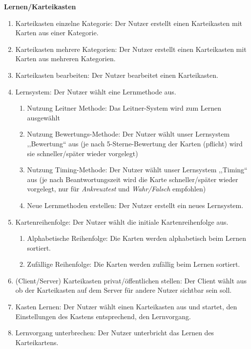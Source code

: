 \documentclass[fontsize=12pt,paper=a4,twoside]{scrartcl}
\begin{document}
\textbf{Lernen/Karteikasten}
\begin{enumerate}[resume, label={N\arabic*}]
	\item Karteikasten einzelne Kategorie: Der Nutzer erstellt einen Karteikasten mit Karten aus einer Kategorie.
	\item Karteikasten mehrere Kategorien: Der Nutzer erstellt einen Karteikasten mit Karten aus mehreren Kategorien.
	\label{N26}
	\item Karteikasten bearbeiten: Der Nutzer bearbeitet einen Karteikasten.
	\item Lernsystem: Der Nutzer wählt eine Lernmethode aus.
	\begin{enumerate}[label*=-\arabic*]
		\item Nutzung Leitner Methode: Das Leitner-System wird zum Lernen ausgewählt
		\item Nutzung Bewertungs-Methode: Der Nutzer wählt unser Lernsystem ,,Bewertung`` aus (je nach 5-Sterne-Bewertung der Karten (pflicht) wird sie schneller/später wieder vorgelegt)
		\item Nutzung Timing-Methode: Der Nutzer wählt unser Lernsystem ,,Timing`` aus (je nach Beantwortungszeit wird die Karte schneller/später wieder vorgelegt, nur für \textit{Ankreuztest} und \textit{Wahr/Falsch} empfohlen)
		\item Neue Lernmethoden erstellen: Der Nutzer erstellt ein neues Lernsystem.
	\end{enumerate}
	\item Kartenreihenfolge: Der Nutzer wählt die initiale Kartenreihenfolge aus.
	\begin{enumerate}[label*=-\arabic*]
		\item Alphabetische Reihenfolge: Die Karten werden alphabetisch beim Lernen sortiert.
		\item Zufällige Reihenfolge: Die Karten werden zufällig beim Lernen sortiert.
    \end{enumerate}
	\item (Client/Server) Karteikasten privat/öffentlichen stellen: Der Client wählt aus ob der Karteikasten auf dem Server für andere Nutzer sichtbar sein soll.
	\label{N30}
	\item Kasten Lernen: Der Nutzer wählt einen Karteikasten aus und startet, den Einstellungen des Kastens entsprechend, den Lernvorgang.
	\item Lernvorgang unterbrechen: Der Nutzer unterbricht das Lernen des Karteikartens.

\end{enumerate}
\end{document}
